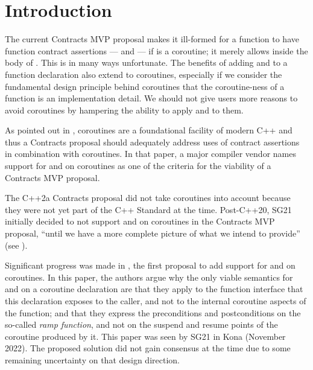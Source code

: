 
\tableofcontents*





\section{Introduction}
\label{intro}

The current Contracts MVP proposal \cite{P2900R8} makes it ill-formed for a function  to have function contract assertions ---  and  --- if  is a coroutine; it merely allows  inside the body of . This is in many ways unfortunate. The benefits of adding  and  to a function declaration also extend to coroutines, especially if we consider the fundamental design principle behind coroutines  that the coroutine-ness of a function is an implementation detail. We should not give users more reasons to avoid coroutines by hampering the ability to apply  and  to them.

As pointed out in \cite{P3173R0}, coroutines are a foundational facility of modern C++ and thus a Contracts proposal should adequately address uses of contract assertions in combination with coroutines. In that paper, a major compiler vendor names support for  and  on coroutines as one of the criteria for the viability of a Contracts MVP proposal.

The C++2a Contracts proposal \cite{P0542R5} did not take coroutines into account because they were not yet part of the C++ Standard at the time. Post-C++20, SG21 initially decided to not support  and  on coroutines in the Contracts MVP proposal, ``until we have a more complete picture of what we intend to provide'' (see \cite{P2932R3}).

Significant progress was made in \cite{P2957R0},  the first proposal to add support for  and  on coroutines. In this paper, the authors argue why the only viable semantics for  and  on a coroutine declaration are that they apply to the function interface that this declaration exposes to the caller, and not to the internal coroutine aspects of the function; and that they express the preconditions and postconditions on the so-called \emph{ramp function}, and not on the suspend and resume points of the coroutine produced by it. This paper was seen by SG21 in Kona (November 2022). The proposed solution did not gain consensus at the time due to some remaining uncertainty on that design direction. 

